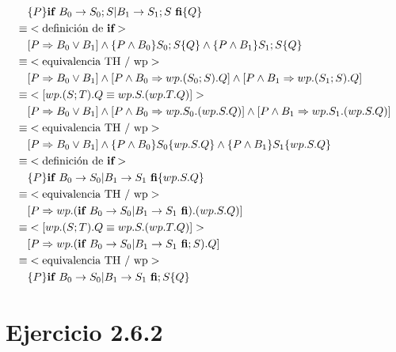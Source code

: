 \documentclass{article}
\begin{document}
\begin{align*}
 & \{P\} \text{{\bf if }} B_0 \rightarrow S_0 ; S | B_1 \rightarrow S_1 ; S \text{ {\bf fi}} \{Q\} \\
 \equiv & <\text{definición de {\bf if}}> \\
 & [ P \Rightarrow B_0 \vee B_1 ] \wedge \{P \wedge B_0\} S_0 ; S \{Q\} \wedge \{P \wedge B_1\} S_1 ; S \{Q\} \\
 \equiv & <\text{equivalencia TH / wp}> \\
 & [ P \Rightarrow B_0 \vee B_1 ] \wedge [P \wedge B_0 \Rightarrow wp.(S_0 ; S).Q] \wedge [P \wedge B_1 \Rightarrow wp.(S_1 ; S).Q] \\
 \equiv & <[wp.(S ; T).Q \equiv wp.S.(wp.T.Q)]> \\
 & [ P \Rightarrow B_0 \vee B_1 ] \wedge [P \wedge B_0 \Rightarrow wp.S_0.(wp.S.Q)] \wedge [P \wedge B_1 \Rightarrow wp.S_1.(wp.S.Q)] \\
 \equiv & <\text{equivalencia TH / wp}> \\
 & [ P \Rightarrow B_0 \vee B_1 ] \wedge \{P \wedge B_0\} S_0 \{wp.S.Q\} \wedge \{P \wedge B_1\} S_1 \{wp.S.Q\} \\
 \equiv & <\text{definición de {\bf if}}> \\
 & \{P\} \text{{\bf if }} B_0 \rightarrow S_0 | B_1 \rightarrow S_1 \text{ {\bf fi}} \{wp.S.Q\} \\
 \equiv & <\text{equivalencia TH / wp}> \\
 & [P \Rightarrow wp.(\text{{\bf if }} B_0 \rightarrow S_0 | B_1 \rightarrow S_1 \text{ {\bf fi}}).(wp.S.Q)] \\
 \equiv & <[wp.(S ; T).Q \equiv wp.S.(wp.T.Q)]> \\
 & [P \Rightarrow wp.(\text{{\bf if }} B_0 \rightarrow S_0 | B_1 \rightarrow S_1 \text{ {\bf fi}} ; S).Q] \\
 \equiv & <\text{equivalencia TH / wp}> \\
 & \{P\} \text{{\bf if }} B_0 \rightarrow S_0 | B_1 \rightarrow S_1 \text{ {\bf fi}} ; S \{Q\}
\end{align*}

\section{Ejercicio 2.6.2}
\end{document}
